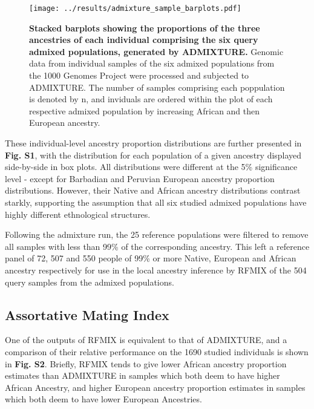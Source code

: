 \documentclass[11pt]{article}
\begin{document}
\begin{figure}[htb!]%
    \centering
    \texttt{[image: 
        ../results/admixture\_sample\_barplots.pdf]} 
    \vspace{-.25cm}
    \caption{\textbf{
        Stacked barplots showing the proportions of the three ancestries of each individual comprising the six query admixed populations, generated by ADMIXTURE.
    }
        Genomic data from individual samples of the six admixed populations from the 1000 Genomes Project were processed and subjected to ADMIXTURE. The number of samples comprising each poppulation is denoted by n, and inviduals are ordered within the plot of each respective admixed population by increasing African and then European ancestry.
    }
\end{figure}





These individual-level ancestry proportion distributions are further presented in \textbf{Fig. S1}, with the distribution for each population of a given ancestry displayed side-by-side in box plots. All distributions were different at the 5\% significance level - except for Barbadian and Peruvian European ancestry proportion distributions. However, their Native and African ancestry distributions contrast starkly, supporting the assumption that all six studied admixed populations have highly different ethnological structures.

Following the admixture run, the 25 reference populations were filtered to remove all samples with less than 99\% of the corresponding ancestry. This left a reference panel of 72, 507 and 550 people of 99\% or more Native, European and African ancestry respectively for use in the local ancestry inference by RFMIX of the 504 query samples from the admixed populations. 









\subsection{Assortative Mating Index}





One of the outputs of RFMIX is equivalent to that of ADMIXTURE, and a comparison of their relative performance on the 1690 studied individuals is shown in \textbf{Fig. S2}. Briefly, RFMIX tends to give lower African ancestry proportion estimates than ADMIXTURE in samples which both deem to have higher African Ancestry, and higher European ancestry proportion estimates in samples which both deem to have lower European Ancestries. 
\end{document}
